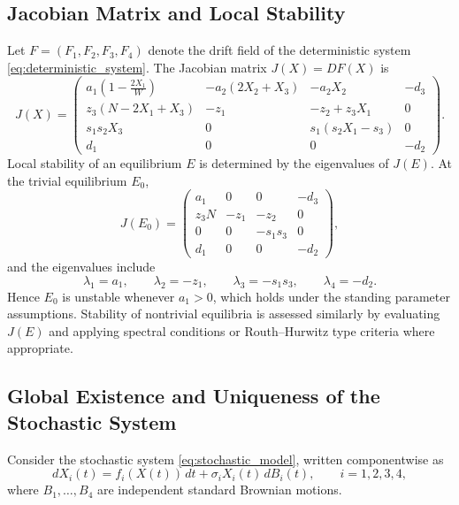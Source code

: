 \documentclass[11pt]{article}
\numberwithin{equation}{section}
\begin{document}
\subsection{Jacobian Matrix and Local Stability}

Let $F=(F_1,F_2,F_3,F_4)$ denote the drift field of the deterministic system \eqref{eq:deterministic_system}. The Jacobian matrix
$J(X)=DF(X)$ is
\begin{equation}\label{eq:Jacobian}
J(X)=
\begin{pmatrix}
a_1\left(1-\frac{2X_1}{W}\right) & -a_2(2X_2+X_3) & -a_2X_2 & -d_3 \\
z_3(N-2X_1+X_3) & -z_1 & -z_2+z_3X_1 & 0 \\
s_1s_2X_3 & 0 & s_1(s_2X_1-s_3) & 0 \\
d_1 & 0 & 0 & -d_2
\end{pmatrix}.
\end{equation}
Local stability of an equilibrium $E$ is determined by the eigenvalues of $J(E)$. At the trivial equilibrium $E_0$,
\begin{equation}\label{eq:J_E0}
J(E_0)=
\begin{pmatrix}
a_1 & 0 & 0 & -d_3 \\
z_3N & -z_1 & -z_2 & 0 \\
0 & 0 & -s_1s_3 & 0 \\
d_1 & 0 & 0 & -d_2
\end{pmatrix},
\end{equation}
and the eigenvalues include
\begin{equation}\label{eq:eigs_E0}
\lambda_1=a_1,\qquad \lambda_2=-z_1,\qquad \lambda_3=-s_1s_3,\qquad \lambda_4=-d_2.
\end{equation}
Hence $E_0$ is unstable whenever $a_1>0$, which holds under the standing parameter assumptions. Stability of nontrivial equilibria is assessed similarly by evaluating $J(E)$ and applying spectral conditions or Routh--Hurwitz type criteria where appropriate.

\subsection{Global Existence and Uniqueness of the Stochastic System}

Consider the stochastic system \eqref{eq:stochastic_model}, written componentwise as
\begin{equation}\label{eq:SDE_component}
dX_i(t)=f_i(X(t))\,dt+\sigma_iX_i(t)\,dB_i(t),\qquad i=1,2,3,4,
\end{equation}
where $B_1,\dots,B_4$ are independent standard Brownian motions.
\end{document}

